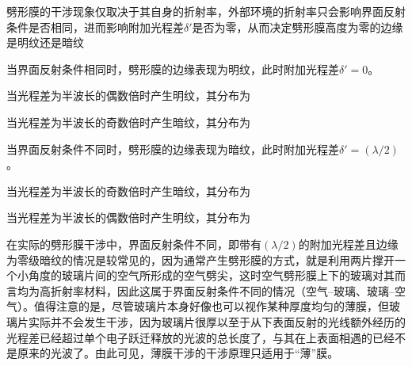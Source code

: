 劈形膜的干涉现象仅取决于其自身的折射率，外部环境的折射率只会影响界面反射条件是否相同，进而影响附加光程差$\delta'$是否为零，从而决定劈形膜高度为零的边缘是明纹还是暗纹
\begin{OldFigure}[劈形膜的干涉条纹]
    \begin{OldFigureSub}[界面反射条件相同]
    \end{OldFigureSub}
    \hspace{0.5cm}
    \begin{OldFigureSub}[界面反射条件不同]
    \end{OldFigureSub}  
\end{OldFigure}
\begin{OldBoxProperty}[劈形膜在反射条件相同时的干涉条纹]
    当界面反射条件相同时，劈形膜的边缘表现为明纹，此时附加光程差$\delta'=0$。

    当光程差为半波长的偶数倍时产生明纹，其分布为
    当光程差为半波长的奇数倍时产生暗纹，其分布为
\end{OldBoxProperty}

\begin{OldBoxProperty}[劈形膜在反射条件不同时的干涉条纹]
    当界面反射条件不同时，劈形膜的边缘表现为暗纹，此时附加光程差$\delta'=(\lambda/2)$。

    当光程差为半波长的奇数倍时产生暗纹，其分布为

    当光程差为半波长的偶数倍时产生明纹，其分布为
\end{OldBoxProperty}

在实际的劈形膜干涉中，界面反射条件不同，即带有$(\lambda/2)$的附加光程差且边缘为零级暗纹的情况是较常见的，因为通常产生劈形膜的方式，就是利用两片撑开一个小角度的玻璃片间的空气所形成的空气劈尖，这时空气劈形膜上下的玻璃对其而言均为高折射率材料，因此这属于界面反射条件不同的情况（空气--玻璃、玻璃--空气）。值得注意的是，尽管玻璃片本身好像也可以视作某种厚度均匀的薄膜，但玻璃片实际并不会发生干涉，因为玻璃片很厚以至于从下表面反射的光线额外经历的光程差已经超过单个电子跃迁释放的光波的总长度了，与其在上表面相遇的已经不是原来的光波了。由此可见，薄膜干涉的干涉原理只适用于“薄”膜。

